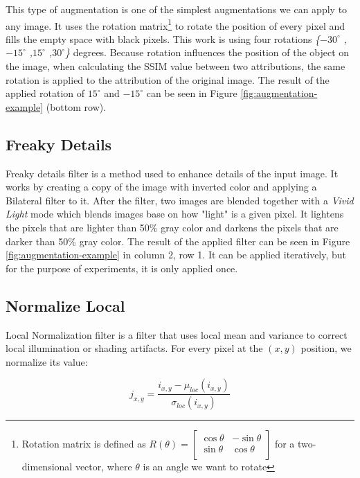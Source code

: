 This type of augmentation is one of the simplest augmentations we can apply to any image. It uses the rotation matrix\footnote{Rotation matrix is defined as ${\displaystyle R(\theta )={\begin{bmatrix}\cos \theta &-\sin \theta \\\sin \theta &\cos \theta \\\end{bmatrix}}}$ for a two-dimensional vector, where $\theta$ is an angle we want to rotate} to rotate the position of every pixel and fills the empty space with black pixels. This work is using four rotations \textit{\{$-30^{\circ}$ ,$-15^{\circ}$ ,$15^{\circ}$ ,$30^{\circ}$\}} degrees. Because rotation influences the position of the object on the image, when calculating the SSIM value between two attributions, the same rotation is applied to the attribution of the original image. The result of the applied rotation of $15^{\circ}$ and $-15^{\circ}$ can be seen in Figure \ref{fig:augmentation-example} (bottom row).

\subsection*{Freaky Details}

Freaky details filter \cite{freaky_details} is a method used to enhance details of the input image. It works by creating a copy of the image with inverted color and applying a Bilateral filter \cite{tomasi1998bilateral} to it. After the filter, two images are blended together with a \textit{Vivid Light} mode which blends images base on how "light" is a given pixel. It lightens the pixels that are lighter than 50\% gray color and darkens the pixels that are darker than 50\% gray color. The result of the applied filter can be seen in Figure \ref{fig:augmentation-example} in column 2, row 1. It can be applied iteratively, but for the purpose of experiments, it is only applied once. 

\subsection*{Normalize Local}

Local Normalization filter \cite{normalize_local} is a filter that uses local mean and variance to correct local illumination or shading artifacts. For every pixel at the $(x,y)$ position, we normalize its value:

\begin{equation}
    j_{x,y} = \frac{i_{x,y} - \mu_{loc}(i_{x,y})}{\sigma_{loc}(i_{x,y})}
    \label{eq:local-norm-pixel}
\end{equation}

